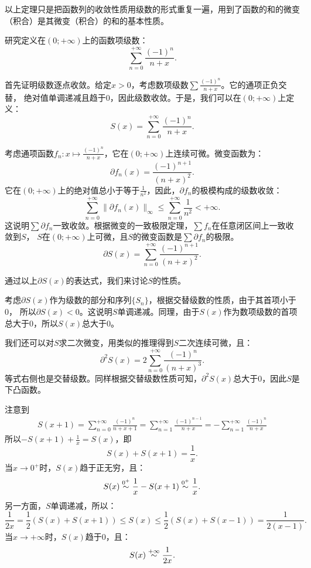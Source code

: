 \documentclass[12pt,UTF8,fontset=none]{ctexbook}
\begin{document}
\begin{appendix}
以上定理只是把函数列的收敛性质用级数的形式重复一遍，用到了函数的和的微变（积合）是其微变（积合）的和的基本性质。

\begin{et}
    研究定义在$(0;+\infty)$上的函数项级数：
    $$\sum_{n=0}^{+\infty} \frac{(-1)^n}{n + x}.$$
\end{et}

\begin{so}
    首先证明级数逐点收敛。给定$x>0$，考虑数项级数$\sum \frac{(-1)^n}{n + x}$。它的通项正负交替，
    绝对值单调递减且趋于$0$，因此级数收敛。于是，我们可以在$(0;+\infty)$上定义：
    $$ S(x) = \sum_{n=0}^{+\infty} \frac{(-1)^n}{n + x}. $$

    考虑通项函数$f_n: x\mapsto \frac{(-1)^n}{n + x}$，它在$(0;+\infty)$上连续可微。微变函数为：
    $$ \partial f_n(x) = \frac{(-1)^{n+1}}{(n + x)^2}. $$
    它在$(0;+\infty)$上的绝对值总小于等于$\frac{1}{n^2}$，因此，$\partial f_n$的极模构成的级数收敛：
    $$ \sum_{n=0}^{+\infty} \| \partial f_n(x) \|_{\infty} \leqslant \sum_{n=0}^{+\infty} \frac{1}{n^2} < +\infty .$$
    这说明$\sum \partial f_n$一致收敛。根据微变的一致极限定理，$\sum f_n$在任意闭区间上一致收敛到$S$，
    $S$在$(0;+\infty)$上可微，且$S$的微变函数是$\sum \partial f_n$的极限。
    $$ \partial S(x) = \sum_{n=0}^{+\infty} \frac{(-1)^{n+1}}{(n + x)^2}. $$

    通过以上$\partial S(x)$的表达式，我们来讨论$S$的性质。

    考虑$\partial S(x)$作为级数的部分和序列$\{S_n\}$，根据交替级数的性质，由于其首项小于$0$，
    所以$\partial S(x) < 0$。这说明$S$单调递减。同理，由于$S(x)$作为数项级数的首项总大于$0$，所以$S(x)$总大于$0$。

    我们还可以对$S$求二次微变，用类似的推理得到$S$二次连续可微，且：
    $$ \partial^2 S(x) = 2\sum_{n=0}^{+\infty} \frac{(-1)^{n}}{(n + x)^3}. $$
    等式右侧也是交替级数。同样根据交替级数性质可知，$\partial^2 S(x)$总大于$0$，因此$S$是下凸函数。

    注意到
    \begin{align*}
        S(x + 1) = \sum_{n=0}^{+\infty} \frac{(-1)^n}{n + x + 1} = \sum_{n=1}^{+\infty} \frac{(-1)^{n-1}}{n + x} = -\sum_{n=1}^{+\infty} \frac{(-1)^{n}}{n + x}
    \end{align*}
    所以$- S(x + 1) + \frac{1}{x} = S(x)$，即
    $$ S(x) + S(x + 1) = \frac{1}{x}.$$
    当$x\to 0^+$时，$S(x)$趋于正无穷，且：
    $$ S(x) \overset{0^+}{\sim} \frac{1}{x} - S(x + 1) \overset{0^+}{\sim} \frac{1}{x}.  $$
    另一方面，$S$单调递减，所以：
    $$ \frac{1}{2x} = \frac{1}{2}\left(S(x) + S(x + 1)\right) \leqslant S(x) \leqslant \frac{1}{2}\left(S(x) + S(x - 1)\right) = \frac{1}{2(x - 1)}.$$
    当$x\to +\infty$时，$S(x)$趋于$0$，且：
    $$ S(x) \overset{+\infty}{\sim} \frac{1}{2x}. $$


\end{so}
\end{appendix}
\end{document}
